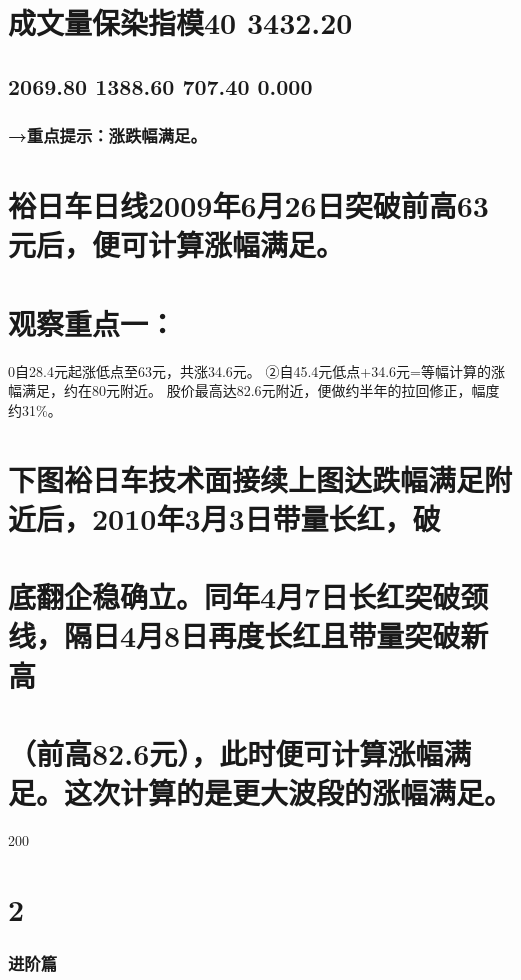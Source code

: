 \documentclass{article}
\begin{document}
\section{成文量保染指模40 3432.20}

\subsection{2069.80 1388.60 707.40 0.000}

\subsubsection{→重点提示：涨跌幅满足。}

\section{裕日车日线2009年6月26日突破前高63元后，便可计算涨幅满足。}

\section{观察重点一：}

0自28.4元起涨低点至63元，共涨34.6元。 ②自45.4元低点+34.6元=等幅计算的涨幅满足，约在80元附近。 股价最高达82.6元附近，便做约半年的拉回修正，幅度约31\%。

\section{下图裕日车技术面接续上图达跌幅满足附近后，2010年3月3日带量长红，破}

\section{底翻企稳确立。同年4月7日长红突破颈线，隔日4月8日再度长红且带量突破新高}

\section{（前高82.6元），此时便可计算涨幅满足。这次计算的是更大波段的涨幅满足。}

200

\clearpage

\section{2}

\subsubsection{进阶篇}
\end{document}
